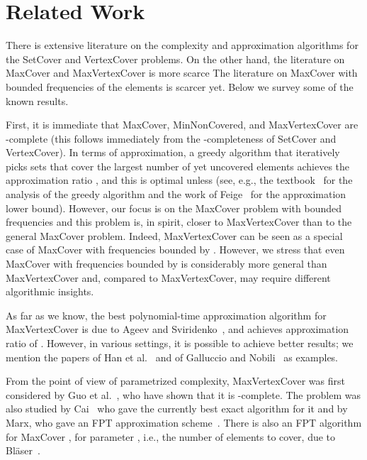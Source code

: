 \documentclass[11pt]{article}
\begin{document}
\section{Related Work}\label{sec:related}

There is extensive literature on the complexity and approximation
algorithms for the SetCover and VertexCover problems.
On the other hand, the literature on MaxCover and MaxVertexCover is
more scarce
The literature on MaxCover with bounded frequencies of the elements is
scarcer yet. Below we survey some of the known results.


First, it is immediate that MaxCover, MinNonCovered, and
MaxVertexCover are -complete (this follows immediately from the
-completeness of SetCover and VertexCover). In terms of
approximation, a greedy algorithm that iteratively picks sets that
cover the largest number of yet uncovered elements achieves the
approximation ratio , and this is optimal unless  (see, e.g., the textbook~\cite{hoc:b:covers} for the analysis of
the greedy algorithm and the work of Feige~\cite{fei:j:cover} for the
approximation lower bound). However, our focus is on the MaxCover
problem with bounded frequencies and this problem is, in spirit,
closer to MaxVertexCover than to the general MaxCover problem. Indeed,
MaxVertexCover can be seen as a special case of MaxCover with
frequencies bounded by . However, we stress that even MaxCover with
frequencies bounded by  is considerably more general than
MaxVertexCover and, compared to MaxVertexCover, may require different
algorithmic insights.

As far as we know, the best polynomial-time approximation algorithm
for MaxVertexCover is due to Ageev and
Sviridenko~\cite{age-svi:b:covers}, and achieves approximation ratio
of . However, in various settings, it is possible to
achieve better results; we mention the papers of Han et
al.~\cite{han-ye-zha-zha:j:cover} and of Galluccio and
Nobili~\cite{gal-nob:j:cover} as examples.

From the point of view of parametrized complexity, MaxVertexCover was
first considered by Guo et
al.~\cite{guo-nie-wer:j:vertex-cover-variants}, who have shown that it
is -complete. The problem was also studied by
Cai~\cite{cai:j:cardinality-constrained} who gave the currently best
exact algorithm for it and by Marx, who gave an FPT approximation
scheme~\cite{Marx06parameterizedcomplexity}. There is also an FPT
algorithm for MaxCover , for parameter , i.e., the number of
elements to cover, due to Bl{\"a}ser~\cite{bla:j:partial-set-cover}.
\end{document}
